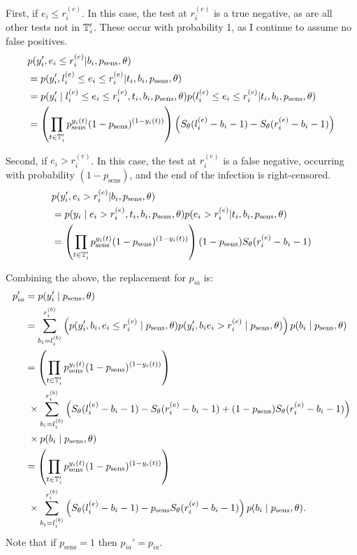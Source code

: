 \documentclass[thesis.tex]{subfiles}
\begin{document}
First, if $e_i \leq r_i^{(e)}$.
In this case, the test at $r_i^{(e)}$ is a true negative, as are all other tests not in $\mathbb{T}'_i$.
These occur with probability 1, as I continue to assume no false positives.
\begin{align}
&p(y_i', e_i \leq r_i^{(e)} | b_i, p_\text{sens}, \theta) \\
&= p(y_i', l_i^{(e)} \leq e_i \leq r_i^{(e)} | t_i, b_i, p_\text{sens}, \theta) \\ %
&= p(y_i' \mid l_i^{(e)} \leq e_i \leq r_i^{(e)}, t_i, b_i, p_\text{sens}, \theta) p(l_i^{(e)} \leq e_i \leq r_i^{(e)} | t_i, b_i, p_\text{sens}, \theta) \\
&= \left( \prod_{t \in \sched'_i} p_\text{sens}^{y_i(t)} (1 - p_\text{sens})^{(1 - y_i(t))} \right) \left( S_\theta(l_i^{(e)} - b_i - 1) - S_\theta(r_i^{(e)} - b_i - 1) \right)
\end{align}

Second, if $e_i > r_i^{(e)}$.
In this case, the test at $r_i^{(e)}$ is a false negative, occurring with probability $(1 - p_\text{sens})$, and the end of the infection is right-censored.
\begin{align}
&p(y_i', e_i > r_i^{(e)} | b_i, p_\text{sens}, \theta) \\
&= p(y_i \mid e_i > r_i^{(e)}, t_i, b_i, p_\text{sens}, \theta) p(e_i > r_i^{(e)} | t_i, b_i, p_\text{sens}, \theta) \\
&= \left( \prod_{t \in \mathbb{T}'_i} p_\text{sens}^{y_i(t)} (1 - p_\text{sens})^{(1 - y_i(t))} \right) (1 - p_\text{sens}) S_\theta(r_i^{(e)} - b_i - 1)
\end{align}

Combining the above, the replacement for $p_{ia}$ is:
\begin{align}
p_{ia}'
&= p(y_i' \mid p_\text{sens}, \theta) \\
&= \sum_{b_i = l_i^{(b)}}^{r_i^{(b)}} \left( p(y_i', b_i, e_i \leq r_i^{(e)} \mid p_\text{sens}, \theta) p(y_i', b_i e_i > r_i^{(e)} \mid p_\text{sens}, \theta) \right) p(b_i \mid p_\text{sens}, \theta) \\
&= \left( \prod_{t \in \mathbb{T}'_i} p_\text{sens}^{y_i(t)} (1 - p_\text{sens})^{(1 - y_i(t))} \right) \\ & \ \times \sum_{b_i = l_i^{(b)}}^{r_i^{(b)}} \left( S_\theta(l_i^{(e)} - b_i - 1) - S_\theta(r_i^{(e)} - b_i - 1) + (1 - p_\text{sens}) S_\theta(r_i^{(e)} - b_i - 1) \right) \\ & \ \times p(b_i \mid p_\text{sens}, \theta) \\
&= \left( \prod_{t \in \mathbb{T}'_i} p_\text{sens}^{y_i(t)} (1 - p_\text{sens})^{(1 - y_i(t))} \right) \\ & \ \times \sum_{b_i = l_i^{(b)}}^{r_i^{(b)}} \left( S_\theta(l_i^{(e)} - b_i - 1) - p_\text{sens} S_\theta(r_i^{(e)} - b_i - 1) \right) p(b_i \mid p_\text{sens}, \theta).
\label{imperf-test:eq:pia-prime}
\end{align}
Note that if $p_\text{sens} = 1$ then $p_{ia}' = p_{ia}$.
\end{document}
